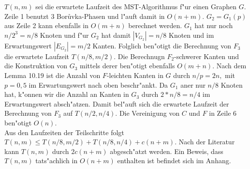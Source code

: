 $T(n,m)$ sei die erwartete Laufzeit des MST-Algorithmus f"ur einen Graphen $G$.
    Zeile 1 benutzt 3 Bor\r uvka-Phasen und  l"auft damit in $O(n+m)$. 
    $G_2 = G_1(p)$ aus Zeile 2 kann ebenfalls in $O(m + n)$ berechnet werden.
    $G_1$ hat nur noch $n/2^3 = n/8$ Knoten und f"ur $G_2$ hat damit 
    $|V_{G_2}| = n/8$ Knoten und im Erwartungswert $|E_{G_2}| = m/2$ Kanten.
    Folglich ben"otigt die Berechnung von $F_3$  die erwartete Laufzeit 
    $T(n/8,m/2)$.
    Die Berechnugn $F_2$-schwerer Kanten und die Konstruktion von $G_3$ mittels
    derer ben"otigt ebenfalls $O(m+n)$.
    Nach dem Lemma 10.19 ist die Anzahl von $F$-leichten Kanten in $G$ durch
    $n/p = 2n,$ mit $p = 0,5$ im Erwartungswert nach oben beschr"ankt. Da $G_1$
    aner nur $n/8$ Knoten hat, k"onnen wir die Anzahl an Kanten in $G_3$
    durch $2*n/8 = n/4$ im Erwartungswert absch"atzen.
    Damit bel"auft sich die erwartete Laufzeit der Berechnung von $F_3$ auf
    $T(n/2, n/4)$.
    Die Vereinigung von $C$ und $F$ in Zeile 6 ben"otigt $O(n)$.\\
Aus den Laufzeiten der Teilschritte folgt
    $T(n,m) \leq T(n/8, m/2) + T(n/8, n/4) + c(n+m)$.
    Nach der Literatur kann $T(n,m)$ durch $2c(n+m)$ abgesch"atzt werden.
    Ein Beweis, dass $T(n,m)$ tats"achlich in $O(n+m)$ enthalten ist befindet
    sich im Anhang.\\
    \\
